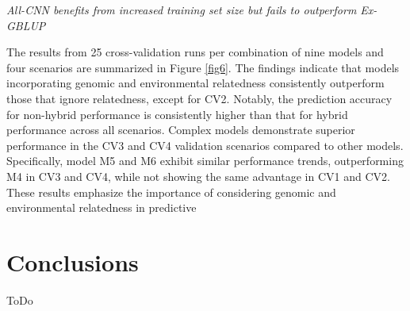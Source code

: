 \documentclass[english, biblatex]{lni}
\begin{document}
\textit{All-CNN benefits from increased training set size but fails to outperform Ex-GBLUP} 

The results from 25 cross-validation runs per combination of nine models and four scenarios are summarized in Figure \ref{fig6}. The findings indicate that models incorporating genomic and environmental relatedness consistently outperform those that ignore relatedness, except for CV2. Notably, the prediction accuracy for non-hybrid performance is consistently higher than that for hybrid performance across all scenarios. Complex models demonstrate superior performance in the CV3 and CV4 validation scenarios compared to other models. Specifically, model M5 and M6 exhibit similar performance trends, outperforming M4 in CV3 and CV4, while not showing the same advantage in CV1 and CV2. These results emphasize the importance of considering genomic and environmental relatedness in predictive

\section{Conclusions}

ToDo

\printbibliography%
\end{document}
